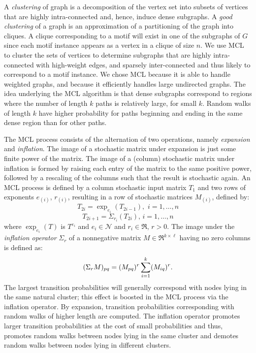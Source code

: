 A {\em clustering} of graph is a decomposition of the vertex set into subsets of vertices that are highly intra-connected and, hence, induce dense subgraphs. A {\em good clustering} of a graph  is an approximation of a partitioning of the graph into cliques. A clique corresponding to a motif will exist in one of the subgraphs of $G$ since each motif instance appears as a vertex in a clique of size $n$.  We use MCL \cite{vD00} to cluster the sets of vertices to determine subgraphs that are highly intra-connected with high-weight edges, and sparsely inter-connected and thus likely to correspond to a motif instance.  We chose MCL because it is able to handle weighted graphs, and because it efficiently handles large undirected graphs. The idea underlying the MCL algorithm is that dense subgraphs correspond to regions where the number of length $k$ paths is relatively large, for small $k$. Random walks of length $k$ have higher probability for paths beginning and ending in the same dense region than for other paths.   

The MCL process consists of the alternation of two operations, namely {\em expansion} and {\em inflation}.  The image of a stochastic matrix under expansion is just some finite power of the matrix.  The image of a (column) stochastic matrix under inflation is formed by raising each entry of the matrix to the same positive power, followed by a rescaling of the columns such that the result is stochastic again.  An MCL process is defined by a column stochastic input matrix $T_1$ and two rows of exponents $e_{(i)}$, $r_{(i)}$, resulting in a row of stochastic matrices $M_{(i)}$, defined by:$$T_{2i} = \exp_{e_i} (T_{2i - 1}),  \,\,	i = 1, \ldots, n$$ $$T_{2i + 1} = \Sigma_{r_i} (T_{2i}),	\, i = 1, \ldots, n$$ where $\exp_{e_i}(T)$ is $T^{e_i}$ and $e_i \in \mathcal{N}$ and $r_i \in \Re$, $r >0$.  The image under the {\em inflation operator} $\Sigma_r$ of a nonnegative matrix $M \in \Re^{k \times \ell}$ having no zero columns is defined as: \[(\Sigma_rM)_{pq} = (M_{pq})^r \/ \sum^{k}_{i = 1} (M_{iq})^r. \] The largest transition probabilities will generally correspond with nodes lying in the same natural cluster; this effect is boosted in the MCL process via the inflation operator. By expansion, transition probabilities corresponding with random walks of higher length are computed.  The inflation operator promotes larger transition probabilities at the cost of small probabilities and thus, promotes random walks between nodes lying in the same cluster and demotes random walks between nodes lying in different clusters. 

